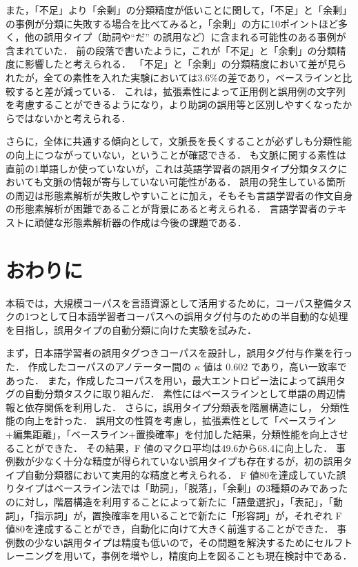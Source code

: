 \documentclass[japanese]{jnlp_1.4}
\begin{document}
また，「不足」より「余剰」の分類精度が低いことに関して，「不足」と「余剰」の事例が分類に失敗する場合を比べてみると，「余剰」の方に10ポイントほど多く，他の誤用タイプ（助詞や``だ'' の誤用など）に含まれる可能性のある事例が含まれていた．
前の段落で書いたように，これが「不足」と「余剰」の分類精度に影響したと考えられる．
「不足」と「余剰」の分類精度において差が見られたが，全ての素性を入れた実験においては3.6\%の差であり，ベースラインと比較すると差が減っている．
これは，拡張素性によって正用例と誤用例の文字列を考慮することができるようになり，より助詞の誤用等と区別しやすくなったからではないかと考えられる．

さらに，全体に共通する傾向として，文脈長を長くすることが必ずしも分類性能の向上につながっていない，ということが確認できる．
も文脈に関する素性は直前の1単語しか使っていないが，これは英語学習者の誤用タイプ分類タスクにおいても文脈の情報が寄与していない可能性がある．
誤用の発生している箇所の周辺は形態素解析が失敗しやすいことに加え，そもそも言語学習者の作文自身の形態素解析が困難であることが背景にあると考えられる．
言語学習者のテキストに頑健な形態素解析器の作成は今後の課題である．


\section{おわりに}

本稿では，大規模コーパスを言語資源として活用するために，コーパス整備タスクの1つとして日本語学習者コーパスへの誤用タグ付与のための半自動的な処理を目指し，誤用タイプの自動分類に向けた実験を試みた．

まず，日本語学習者の誤用タグつきコーパスを設計し，誤用タグ付与作業を行った．
作成したコーパスのアノテーター間の $\kappa$ 値は 0.602 であり，高い一致率であった．
また，作成したコーパスを用い，最大エントロピー法によって誤用タグの自動分類タスクに取り組んだ．
素性にはベースラインとして単語の周辺情報と依存関係を利用した．
さらに，誤用タイプ分類表を階層構造にし，
分類性能の向上を計った．
誤用文の性質を考慮し，拡張素性として「ベースライン+編集距離」，「ベースライン+置換確率」を付加した結果，分類性能を向上させることができた．
その結果，F 値のマクロ平均は49.6から68.4に向上した．
事例数が少なく十分な精度が得られていない誤用タイプも存在するが，初の誤用タイプ自動分類器において実用的な精度と考えられる．
F 値80を達成していた誤りタイプはベースライン法では「助詞」，「脱落」，「余剰」の3種類のみであったのに対し，階層構造を利用することによって新たに「語彙選択」，「表記」，「動詞」，「指示詞」が，置換確率を用いることで新たに「形容詞」が，それぞれ F 値80を達成することができ，自動化に向けて大きく前進することができた．
事例数の少ない誤用タイプは精度も低いので，その問題を解決するためにセルフトレーニングを用いて，事例を増やし，精度向上を図ることも現在検討中である．
\end{document}
